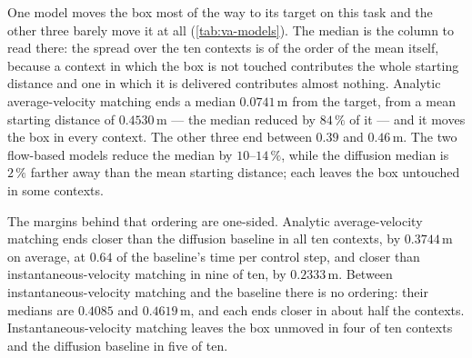 One model moves the box most of the way to its target on this task and the other three barely move it at all
(\autoref{tab:va-models}). The median is the column to read there: the spread over the ten contexts is
of the order of the mean itself, because a context in which the box is not touched contributes the whole
starting distance and one in which it is delivered contributes almost nothing. Analytic average-velocity matching ends a median $0.0741$\,m from the target,
from a mean starting distance of $0.4530$\,m --- the median reduced by $84\,\%$ of it --- and it moves the box in every context. The other three end between $0.39$ and $0.46$\,m. The two
flow-based models reduce the median by $10$--$14\,\%$, while the diffusion median is $2\,\%$ farther
away than the mean starting distance; each leaves the box untouched in some contexts.

The margins behind that ordering are one-sided. Analytic average-velocity matching ends closer than the
diffusion baseline in all ten contexts, by $0.3744$\,m on average, at $0.64$ of the baseline's time per
control step, and closer than instantaneous-velocity matching in nine of ten, by $0.2333$\,m. Between
instantaneous-velocity matching and the baseline there is no ordering: their medians are $0.4085$ and
$0.4619$\,m, and each ends closer in about half the contexts. Instantaneous-velocity matching leaves the
box unmoved in four of ten contexts and the diffusion baseline in five of ten.

